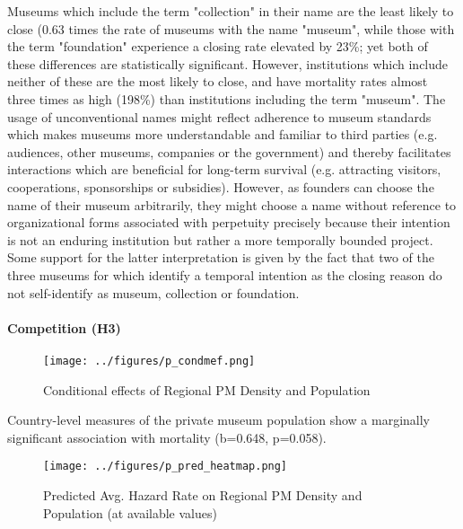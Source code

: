 \documentclass[12pt]{article}
\begin{document}
Museums which include the term "collection" in their name are the least likely to close (0.63 times the rate of museums with the name "museum", while those with the term "foundation" experience a closing rate elevated by 23\%; yet both of these differences are statistically significant.
However, institutions which include neither of these are the most likely to close, and have mortality rates almost three times as high (198\%) than institutions including the term "museum".
The usage of unconventional names might reflect adherence to museum standards which makes museums more understandable and familiar to third parties (e.g. audiences, other museums, companies or the government) and thereby facilitates interactions which are beneficial for long-term survival (e.g. attracting visitors, cooperations, sponsorships or subsidies).
However, as founders can choose the name of their museum arbitrarily, they might choose a name without reference to organizational forms associated with perpetuity precisely because their intention is not an enduring institution but rather a more temporally bounded project.
Some support for the latter interpretation is given by the fact that two of the three museums for which \textcite{Velthuis_Gera_2024_fragility} identify a temporal intention as the closing reason do not self-identify as museum, collection or foundation.
\paragraph*{Competition (H3)}


\begin{figure}[htbp]
\centering
\texttt{[image: ../figures/p\_condmef.png]}
\caption{\label{fig:p_condmef}Conditional effects of Regional PM Density and Population}
\end{figure}


Country-level measures of the private museum population show a marginally significant association with mortality (b=0.648, p=0.058).
\begin{figure}[htbp]
\centering
\texttt{[image: ../figures/p\_pred\_heatmap.png]}
\caption{\label{fig:p_pred_heatmap}Predicted Avg. Hazard Rate on Regional PM Density and Population (at available values)}
\end{figure}
\end{document}
